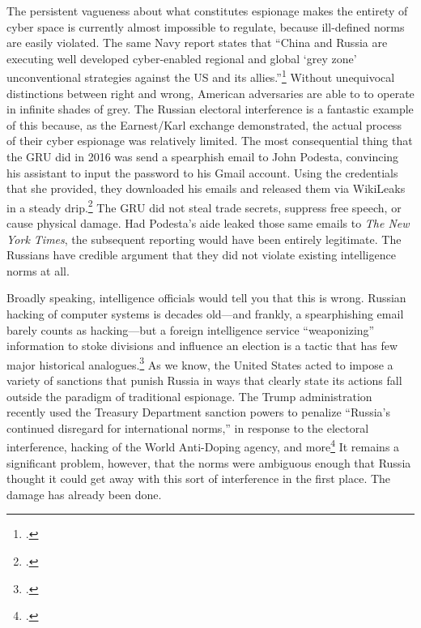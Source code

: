 \documentclass{memoir}
\begin{document}
\begin{refsegment}
The persistent vagueness about what constitutes espionage makes the entirety of cyber space is currently almost impossible to regulate, because ill-defined norms are easily violated. The same Navy report states that ``China and Russia are executing well developed cyber-enabled regional and global `grey zone' unconventional strategies against the US and its allies.''\footcite[p.~4]{bayer_cybersecurity_2019} Without unequivocal distinctions between right and wrong, American adversaries are able to to operate in infinite shades of grey. The Russian electoral interference is a fantastic example of this because, as the Earnest/Karl exchange demonstrated, the actual process of their cyber espionage was relatively limited. The most consequential thing that the GRU did in 2016 was send a spearphish email to John Podesta, convincing his assistant to input the password to his Gmail account. Using the credentials that she provided, they downloaded his emails and released them via WikiLeaks in a steady drip.\footcite{nakashima_how_2018} The GRU did not steal trade secrets, suppress free speech, or cause physical damage. Had Podesta's aide leaked those same emails to \emph{The New York Times}, the subsequent reporting would have been entirely legitimate. The Russians have credible argument that they did not violate existing intelligence norms at all.

Broadly speaking, intelligence officials would tell you that this is wrong. Russian hacking of computer systems is decades old---and frankly, a spearphishing email barely counts as hacking---but a foreign intelligence service ``weaponizing'' information to stoke divisions and influence an election is a tactic that has few major historical analogues.\footcite{nakashima_how_2018} As we know, the United States acted to impose a variety of sanctions that punish Russia in ways that clearly state its actions fall outside the paradigm of traditional espionage. The Trump administration recently used the Treasury Department sanction powers to penalize ``Russia’s continued disregard for international norms,'' in response to the electoral interference, hacking of the World Anti-Doping agency, and more\footcite{department_of_the_treasury_treasury_2018} It remains a significant problem, however, that the norms were ambiguous enough that Russia thought it could get away with this sort of interference in the first place. The damage has already been done.


\end{refsegment}
\end{document}
